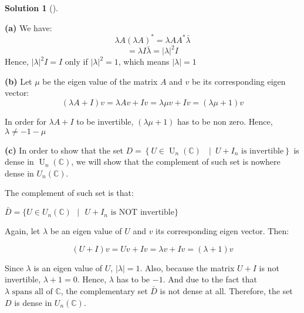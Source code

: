 \documentclass[numbers=enddot,12pt,final,onecolumn,notitlepage]{scrartcl}
\newcounter{sol}
\theoremstyle{definition}
\newtheorem{solu}[sol]{Solution}
\newenvironment{solution}[1][]
{\begin{solu}[#1]\begin{leftbar}}
        {\end{leftbar}\end{solu}}
\begin{document}
\begin{solution}
	\textbf{(a)} We have:
	\[
		\lambda A (\lambda A)^{\ast} = \lambda A A^{\ast} \bar{\lambda}
	\]
	\[
		= \lambda I \bar{\lambda} = \vert \lambda \vert ^{2} I
	\]
	Hence, $\vert \lambda \vert ^{2} I = I$ only if $\vert \lambda \vert ^{2} = 1$, which means $\vert \lambda \vert = 1$

	\textbf{(b)} Let $\mu$ be the eigen value of the matrix $A$ and $v$ be its corresponding eigen vector:
	\[
		(\lambda A + I)v = \lambda Av + Iv = \lambda \mu v + Iv = (\lambda \mu + 1)v
	\]

	In order for $\lambda A + I$ to be invertible, $(\lambda \mu + 1)$ has to be non zero. Hence, $\lambda \neq -1 -\mu$

	\textbf{(c)}
	In order to show that the set $D = \left\{  U\in\operatorname*{U}\nolimits_{n}\left(
		\mathbb{C}\right)  \text{ }\mid\ U+I_{n}\text{ is invertible}\right\}  $ is
	dense in $\operatorname*{U}\nolimits_{n}\left(  \mathbb{C}\right)  $, we will show that the complement of such set is nowhere dense in $U_n(\mathbb{C})$.

	The complement of such set is that:

	$\bar{D} = \{U \in U_n(\mathbb{C})\text{ }|\text{ }U + I_n \text{ is NOT invertible}\}$

	Again, let $\lambda$ be an eigen value of $U$ and $v$ its corresponding eigen vector. Then:

	\[
		(U + I)v = Uv + Iv = \lambda v + Iv = (\lambda + 1)v
	\]

	Since $\lambda$ is an eigen value of $U$, $\vert \lambda \vert = 1$. Also, because the matrix $U + I$ is not invertible, $\lambda + 1 = 0$. Hence, $\lambda$ has to be $-1$. And due to the fact that $\lambda \text{ spans all of } \mathbb{C}$, the complementary set $\bar{D}$ is not dense at all. Therefore, the set $D$ is dense in $U_n(\mathbb{C})$.

\end{solution}
\end{document}

